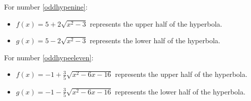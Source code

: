 \documentclass{ximera}
\begin{document}
\begin{enumerate}
For number \ref{oddhypenine}:

\begin{itemize}

\item  $f(x) = 5+2 \sqrt{x^2-3}$ represents the upper half of the hyperbola.

\item  $g(x) = 5-2 \sqrt{x^2-3}$ represents the lower half of the hyperbola.

\end{itemize}

For number \ref{oddhypeeleven}:

\begin{itemize}

\item  $f(x) = -1+ \frac{3}{5} \sqrt{x^2-6x-16}$ represents the upper half of the hyperbola.

\item  $g(x) = -1- \frac{3}{5} \sqrt{x^2-6x-16} $ represents the lower half of the hyperbola.

\end{itemize}


\setcounter{HW}{\value{enumi}}
\end{enumerate}
\end{document}
